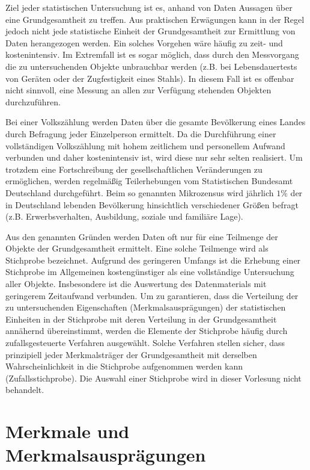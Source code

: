 \documentclass{lecture}
\begin{document}
    Ziel jeder statistischen Untersuchung ist es, anhand von Daten Aussagen über eine Grundgesamtheit zu treffen.
    Aus praktischen Erwägungen kann in der Regel jedoch nicht jede statistische Einheit der Grundgesamtheit zur Ermittlung von Daten herangezogen werden.
    Ein solches Vorgehen wäre häufig zu zeit- und kostenintensiv.
    Im Extremfall ist es sogar möglich, dass durch den Messvorgang die zu untersuchenden Objekte unbrauchbar werden (z.B. bei Lebensdauertests von Geräten oder der Zugfestigkeit eines Stahls).
    In diesem Fall ist es offenbar nicht sinnvoll, eine Messung an allen zur Verfügung stehenden Objekten durchzuführen.

    \begin{example}
        Bei einer Volkszählung werden Daten über die gesamte Bevölkerung eines Landes durch Befragung jeder Einzelperson ermittelt.
        Da die Durchführung einer vollständigen Volkszählung mit hohem zeitlichem und personellem Aufwand verbunden und daher kostenintensiv ist, wird diese nur sehr selten realisiert.
        Um trotzdem eine Fortschreibung der gesellschaftlichen Veränderungen zu ermöglichen, werden regelmäßig Teilerhebungen vom Statistischen Bundesamt Deutschland durchgeführt.
        Beim so genannten Mikrozensus wird jährlich \(1\%\) der in Deutschland lebenden Bevölkerung hinsichtlich verschiedener Größen befragt (z.B. Erwerbsverhalten, Ausbildung, soziale und familiäre Lage).
    \end{example}

    Aus den genannten Gründen werden Daten oft nur für eine Teilmenge der Objekte der Grundgesamtheit ermittelt.
    Eine solche Teilmenge wird als Stichprobe bezeichnet.
    Aufgrund des geringeren Umfangs ist die Erhebung einer Stichprobe im Allgemeinen kostengünstiger als eine vollständige Untersuchung aller Objekte.
    Insbesondere ist die Auswertung des Datenmaterials mit geringerem Zeitaufwand verbunden.
    Um zu garantieren, dass die Verteilung der zu untersuchenden Eigenschaften (Merkmalsausprägungen) der statistischen Einheiten in der Stichprobe mit deren Verteilung in der Grundgesamtheit annähernd übereinstimmt, werden die Elemente der Stichprobe häufig durch zufallsgesteuerte Verfahren ausgewählt.
    Solche Verfahren stellen sicher, dass prinzipiell jeder Merkmalsträger der Grundgesamtheit mit derselben Wahrscheinlichkeit in die Stichprobe aufgenommen werden kann (Zufallsstichprobe).
    Die Auswahl einer Stichprobe wird in dieser Vorlesung nicht behandelt.


    \section*{Merkmale und Merkmalsausprägungen}
\end{document}
